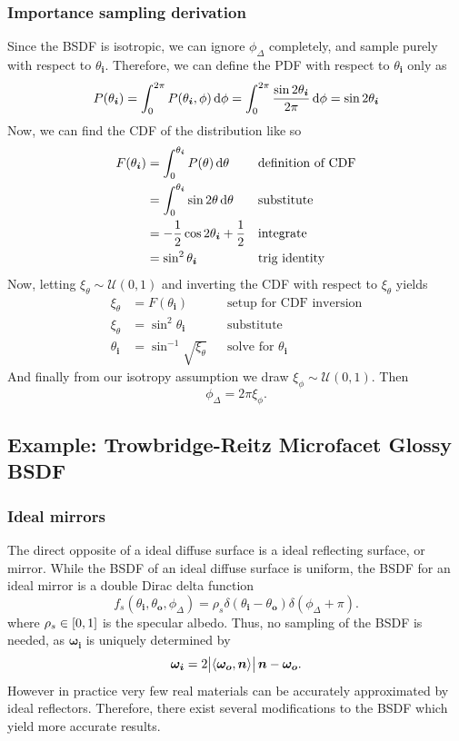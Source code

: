 \documentclass[12pt]{article}
\DeclarePairedDelimiter\ip{\langle }{\rangle}
\begin{document}
\subsubsection{Importance sampling derivation}
Since the BSDF is isotropic, we can ignore \(\phi_\Delta\) completely, and sample purely with respect to \(\theta_{\bm i}\).
Therefore, we can define the PDF with respect to \(\theta_{\bm i}\) only as
\[P(\theta_{\bm i}) = \int_0^{2\pi} P(\theta_{\bm i}, \phi)\dif \phi = \int_0^{2\pi} \frac{\sin 2\theta_{\bm i}}{2\pi} \dif \phi = \sin 2\theta_{\bm i}\]
Now, we can find the CDF of the distribution like so
\begin{align*}
  F(\theta_{\bm i})
  &= \int_0^{\theta_{\bm i}} P(\theta) \dif \theta && \text{definition of CDF}\\
  &= \int_0^{\theta_{\bm i}} \sin 2\theta \dif \theta && \text{substitute}\\
  &= -\frac{1}{2}\cos 2\theta_{\bm i} + \frac{1}{2} && \text{integrate}\\
  &= \sin^2 \theta_{\bm i} && \text{trig identity}
\end{align*}
Now, letting \(\xi_\theta \sim \mathcal{U}(0, 1)\) and inverting the CDF with respect to \(\xi_\theta\) yields
\begin{align*}
  \xi_\theta &= F(\theta_{\bm i}) && \text{setup for CDF inversion}\\
  \xi_\theta &= \sin^2 \theta_{\bm i} && \text{substitute}\\
  \theta_{\bm i} &= \sin^{-1}\sqrt{\xi_\theta} && \text{solve for \(\theta_{\bm i}\)}
\end{align*}
And finally from our isotropy assumption we draw \(\xi_\phi \sim \mathcal{U}(0, 1)\).
Then
\[\phi_\Delta = 2\pi\xi_\phi .\]

\subsection{Example: Trowbridge-Reitz Microfacet Glossy BSDF}

\subsubsection{Ideal mirrors}

The direct opposite of a ideal diffuse surface is a ideal reflecting surface, or mirror.
While the BSDF of an ideal diffuse surface is uniform, the BSDF for an ideal mirror is a double Dirac delta function
\[f_s(\theta_{\bm i}, \theta_{\bm o}, \phi_\Delta) = \rho_s \delta(\theta_{\bm i} - \theta_{\bm o})\delta(\phi_\Delta + \pi).\]
where \(\rho_s \in \intcc{0, 1}\) is the specular albedo.
Thus, no sampling of the BSDF is needed, as \(\bm{\omega_i}\) is uniquely determined by
\[\bm{\omega_i} = 2\abs{\ip{\bm{\omega_o}, \bm n}}\bm n-  \bm{\omega_o}.\]
However in practice very few real materials can be accurately approximated by ideal reflectors.
Therefore, there exist several modifications to the BSDF which yield more accurate results.
\end{document}
